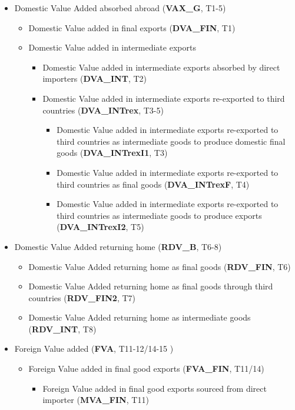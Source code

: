 \documentclass[a4paper]{article}\usepackage[]{graphicx}\usepackage[]{color}
\begin{document}
\begin{itemize}
\item Domestic Value Added absorbed abroad (\textbf{VAX\_G}, T1-5)
\begin{itemize}
\item Domestic Value added in final exports (\textbf{DVA\_FIN}, T1)
\item Domestic Value added in intermediate exports
\begin{itemize}
\item Domestic Value added in intermediate exports absorbed by direct importers (\textbf{DVA\_INT}, T2)
\item Domestic Value added in intermediate exports re-exported to third countries (\textbf{DVA\_INTrex}, T3-5)
\begin{itemize}
\item Domestic Value added in intermediate exports re-exported to third countries as intermediate goods to produce domestic final goods (\textbf{DVA\_INTrexI1}, T3)
\item Domestic Value added in intermediate exports re-exported to third countries as  final goods (\textbf{DVA\_INTrexF}, T4)
\item Domestic Value added in intermediate exports re-exported to third countries as intermediate goods to produce exports (\textbf{DVA\_INTrexI2}, T5)
\end{itemize}
\end{itemize}
\end{itemize}
\item Domestic Value Added returning home (\textbf{RDV\_B}, T6-8)
\begin{itemize}
\item Domestic Value Added returning home as final goods (\textbf{RDV\_FIN}, T6)
\item Domestic Value Added returning home as final goods through third countries (\textbf{RDV\_FIN2}, T7)
\item Domestic Value Added returning home as intermediate goods (\textbf{RDV\_INT}, T8)
\end{itemize}
\item Foreign Value added (\textbf{FVA}, T11-12/14-15 )
\begin{itemize}
\item Foreign Value added in final good exports (\textbf{FVA\_FIN}, T11/14)
\begin{itemize}
\item Foreign Value added in final good exports sourced from direct importer (\textbf{MVA\_FIN}, T11)

\end{itemize}
\end{itemize}
\end{itemize}
\end{document}
